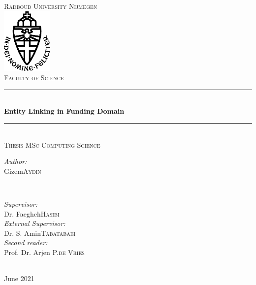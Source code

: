\documentclass{report}
\title{\thesistitle}
\author{\thesisauthorfirst\space\thesisauthorsecond}
\date{\thesisdate}
\def\thesistitle{Entity Linking in Funding Domain}
\def\thesissubtitle{Thesis Subtitle}
\def\thesisauthorfirst{Gizem}
\def\thesisauthorsecond{Aydin}
\def\thesissupervisorfirst{Dr. Faegheh}
\def\thesissupervisorsecond{Hasibi}
\def\extthesissupervisorfirst{Dr. S. Amin}
\def\extthesissupervisorsecond{Tabatabaei}
\def\thesissecondreaderfirst{Prof. Dr. Arjen P.}
\def\thesissecondreadersecond{de Vries}
\def\thesisdate{June 2021}
\theoremstyle{definition}
\theoremstyle{remark}
\begin{document}
\begin{titlepage}
	\thispagestyle{empty}
	\newcommand{\HRule}{\rule{\linewidth}{0.5mm}}
	\center
	\textsc{\Large Radboud University Nijmegen}\\[.7cm]
	\includegraphics[width=25mm]{img/in_dei_nomine_feliciter.eps}\\[.5cm]
	\textsc{Faculty of Science}\\[0.5cm]
	
	\HRule \\[0.4cm]
	{ \huge \bfseries \thesistitle}\\[0.1cm]
	\HRule \\[.5cm]
	\textsc{\large Thesis MSc Computing Science}\\[.5cm]
	
	\begin{minipage}{0.4\textwidth}
	\begin{flushleft} \large
	\emph{Author:}\\
	\thesisauthorfirst\space \textsc{\thesisauthorsecond}
	\end{flushleft}
	\end{minipage}
	~
	\begin{minipage}{0.4\textwidth}
	\begin{flushright} \large
	\emph{Supervisor:} \\
	\thesissupervisorfirst\space \textsc{\thesissupervisorsecond} \\[1em]
	\emph{External Supervisor:} \\
	\extthesissupervisorfirst\space \textsc{\extthesissupervisorsecond} \\[1em]
	\emph{Second reader:} \\
	\thesissecondreaderfirst\space \textsc{\thesissecondreadersecond}
	\end{flushright}
	\end{minipage}\\[4cm]
	\vfill
	{\large \thesisdate}\\
	\clearpage
\end{titlepage}
\end{document}
